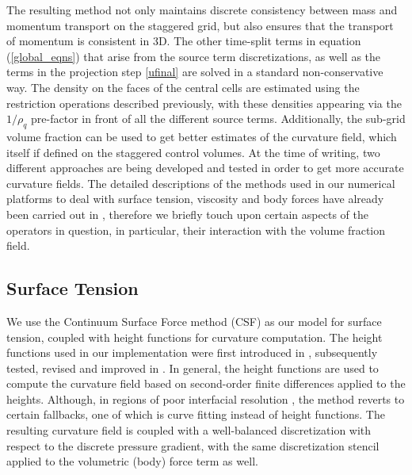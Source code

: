 The resulting method not only maintains discrete consistency between
mass and momentum transport on the staggered grid, but also ensures that
the transport of momentum is consistent in 3D.
The other time-split terms in equation (\ref{global_eqns}) 
that arise from the source term discretizations, as well 
as the terms in the projection step \eqref{ufinal} are solved in 
a standard non-conservative way. 
The density on the faces of the central cells 
are estimated using the restriction operations
described previously, with these densities appearing 
via the $ 1 / \rho_q $ pre-factor in front of all
the different source terms. Additionally, the sub-grid volume fraction
can be used to get better estimates of the curvature field, which
itself if defined on the staggered control volumes. At the time of writing, 
two different approaches are being developed and tested in order to 
get more accurate curvature fields. 
The detailed descriptions of the methods used in our numerical platforms to deal with surface tension,
viscosity and body forces have already been carried out in \cite{paris, basilisk, popinet2009accurate}, 
therefore we briefly touch upon certain aspects of the operators in question, in particular, 
their interaction with the volume fraction field.

\subsection*{Surface Tension}
We use the Continuum Surface Force method (CSF) as our model for surface tension, 
coupled with height functions for curvature computation. 
The height functions used in our implementation were first introduced in \cite{popinet2009accurate}
, subsequently tested, revised and improved in \cite{bornia2011properties,owkes2015mesh}. 
In general, the height functions are used to compute the curvature field based 
on second-order finite differences applied to the heights. 
Although, in regions of poor interfacial resolution 
, 
the method reverts to certain fallbacks, one of which is curve fitting instead of height functions.  
The resulting curvature field is coupled with a well-balanced discretization with
respect to the discrete pressure gradient, with the same discretization 
stencil applied to the volumetric (body) force term as well. 



